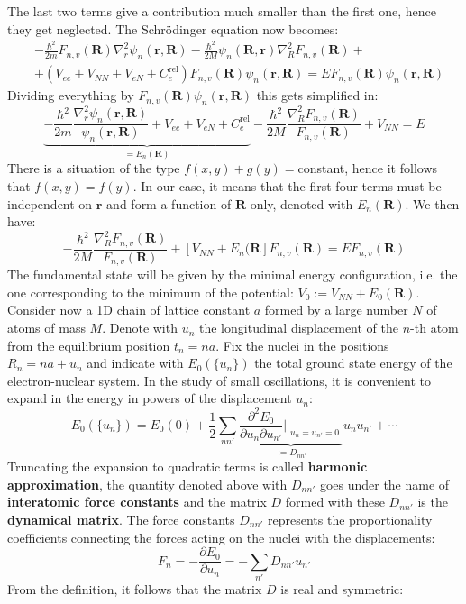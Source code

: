 \documentclass[10.75pt,a4paper,openright,bottom=2cm]{article}
\renewcommand{\Vec}[1]{\boldsymbol{#1}}
\begin{document}
The last two terms give a contribution much smaller than the first one, hence they get neglected. The Schr\"odinger equation now becomes:
\begin{align*}
&-\frac{\hbar^2}{2m}F_{n,v}(\Vec{R})\nabla_r^2\psi_n(\Vec{r},\Vec{R})-\frac{\hbar^2}{2M}\psi_n(\Vec{R},\Vec{r})\nabla_R^2F_{n,v}(\Vec{R})+\\
&+(V_{ee}+V_{NN}+V_{eN}+C_e^{\text{rel}})F_{n,v}(\Vec{R})\psi_n(\Vec{r},\Vec{R})=EF_{n,v}(\Vec{R})\psi_n(\Vec{r},\Vec{R})
\end{align*}
Dividing everything by $F_{n,v}(\Vec{R})\psi_n(\Vec{r},\Vec{R})$ this gets simplified in:
\[
\underbrace{-\frac{\hbar^2}{2m}\frac{\nabla_r^2\psi_n(\Vec{r},\Vec{R})}{\psi_n(\Vec{r},\Vec{R})}+V_{ee}+V_{eN}+C_e^{\text{rel}}}_{=E_n(\Vec{R})}-\frac{\hbar^2}{2M}\frac{\nabla_R^2F_{n,v}(\Vec{R})}{F_{n,v}(\Vec{R})}+V_{NN}=E
\]
There is a situation of the type $f(x,y)+g(y)=$constant, hence it follows that $f(x,y)=f(y)$. In our case, it means that the first four terms must be independent on $\Vec{r}$ and form a function of $\Vec{R}$ only, denoted with $E_n(\Vec{R})$. We then have:
\[
-\frac{\hbar^2}{2M}\frac{\nabla_R^2F_{n,v}(\Vec{R})}{F_{n,v}(\Vec{R})}+[V_{NN}+E_n(\Vec{R}]F_{n,v}(\Vec{R})=EF_{n,v}(\Vec{R})
\]
The fundamental state will be given by the minimal energy configuration, i.e. the one corresponding to the minimum of the potential: $V_0:=V_{NN}+E_0(\Vec{R})$.\\
Consider now a 1D chain of lattice constant $a$ formed by a large number $N$ of atoms of mass $M$. Denote with $u_n$ the longitudinal displacement of the $n$-th atom from the equilibrium position $t_n=na$. Fix the nuclei in the positions $R_n=na+u_n$ and indicate with $E_0(\{u_n\})$ the total ground state energy of the electron-nuclear system. In the study of small oscillations, it is convenient to expand in the energy in powers of the displacement $u_n$:
\[
E_0(\{u_n\})=E_0(0)+\frac{1}{2}\sum_{nn'}\underbrace{\frac{\partial^2E_0}{\partial u_n\partial u_{n'}}\Bigr|_{\substack{u_n=u_{n'}=0}}}_{:=D_{nn'}}u_nu_{n'}+\cdots
\]
Truncating the expansion to quadratic terms is called \textbf{harmonic approximation}, the quantity denoted above with $D_{nn'}$ goes under the name of \textbf{interatomic force constants} and the matrix $D$ formed with these $D_{nn'}$ is the \textbf{dynamical matrix}. The force constants $D_{nn'}$ represents the proportionality coefficients connecting the forces acting on the nuclei with the displacements:
\[
F_n=-\frac{\partial E_0}{\partial u_n}=-\sum_{n'}D_{nn'}u_{n'}
\]
From the definition, it follows that the matrix $D$ is real and symmetric:
\end{document}
